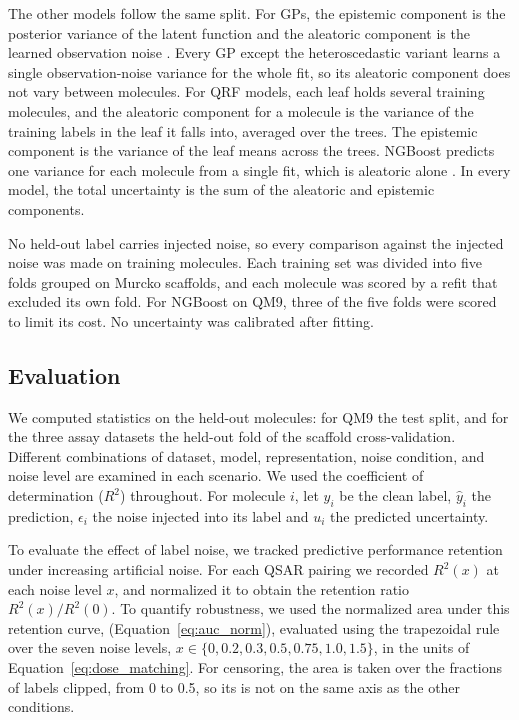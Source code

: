 The other models follow the same split. For GPs, the epistemic component is the posterior variance of the latent function and the aleatoric component is the learned observation noise \citep{Rasmussen2005}. Every GP except the heteroscedastic variant learns a single observation-noise variance for the whole fit, so its aleatoric component does not vary between molecules. For QRF models, each leaf holds several training molecules, and the aleatoric component for a molecule is the variance of the training labels in the leaf it falls into, averaged over the trees. The epistemic component is the variance of the leaf means across the trees. NGBoost predicts one variance for each molecule from a single fit, which is aleatoric alone \citep{Duan2020}. In every model, the total uncertainty is the sum of the aleatoric and epistemic components.

No held-out label carries injected noise, so every comparison against the injected noise was made on
training molecules. Each training set was divided into five folds grouped on Murcko scaffolds, and each
molecule was scored by a refit that excluded its own fold. For NGBoost on QM9, three of the five folds
were scored to limit its cost. No uncertainty was calibrated after fitting.


\subsection{Evaluation}
We computed statistics on the held-out molecules: for QM9 the test split, and for the three assay datasets the held-out fold of the scaffold cross-validation. Different combinations of dataset, model, representation, noise condition, and noise level are examined in each scenario. We used the coefficient of determination ($R^2$) throughout. For molecule $i$, let $y_i$ be the clean label, $\hat{y}_i$ the prediction, $\epsilon_i$ the noise injected into its label and $u_i$ the predicted uncertainty.

To evaluate the effect of label noise, we tracked predictive performance retention under increasing artificial noise. For each QSAR pairing we recorded $R^2(x)$ at each noise level $x$, and normalized it to obtain the retention ratio $R^2(x)/R^2(0)$. To quantify robustness, we used the normalized area under this retention curve, \aucnorm{} (Equation~\ref{eq:auc_norm}), evaluated using the trapezoidal rule over the seven noise levels, $x \in \{0, 0.2, 0.3, 0.5, 0.75, 1.0, 1.5\}$, in the units of Equation~\ref{eq:dose_matching}. For censoring, the area is taken over the fractions of labels clipped, from 0 to 0.5, so its \aucnorm{} is not on the same axis as the other conditions.

